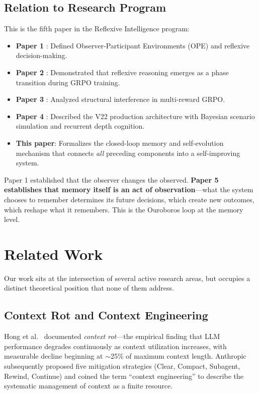 \documentclass[11pt, a4paper]{article}
\begin{document}
\subsection{Relation to Research Program}

This is the fifth paper in the Reflexive Intelligence program:
\begin{itemize}[leftmargin=*]
  \item \textbf{Paper 1} \cite{paper1}: Defined Observer-Participant Environments (OPE) and reflexive decision-making.
  \item \textbf{Paper 2} \cite{paper2}: Demonstrated that reflexive reasoning emerges as a phase transition during GRPO training.
  \item \textbf{Paper 3} \cite{paper3}: Analyzed structural interference in multi-reward GRPO.
  \item \textbf{Paper 4} \cite{paper4}: Described the V22 production architecture with Bayesian scenario simulation and recurrent depth cognition.
  \item \textbf{This paper}: Formalizes the closed-loop memory and self-evolution mechanism that connects \emph{all} preceding components into a self-improving system.
\end{itemize}

Paper 1 established that the observer changes the observed. \textbf{Paper 5 establishes that memory itself is an act of observation}---what the system chooses to remember determines its future decisions, which create new outcomes, which reshape what it remembers. This is the Ouroboros loop at the memory level.


\section{Related Work}
\label{sec:related}

Our work sits at the intersection of several active research areas, but occupies a distinct theoretical position that none of them address.

\subsection{Context Rot and Context Engineering}

Hong et al.~\cite{hong2025contextrot} documented \emph{context rot}---the empirical finding that LLM performance degrades continuously as context utilization increases, with measurable decline beginning at $\sim$25\% of maximum context length. Anthropic~\cite{anthropic2025context} subsequently proposed five mitigation strategies (Clear, Compact, Subagent, Rewind, Continue) and coined the term ``context engineering'' to describe the systematic management of context as a finite resource.
\end{document}
